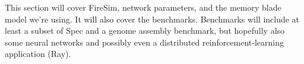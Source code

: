 This section will cover FireSim, network parameters, and the memory blade model we're using. It will also cover the benchmarks. Benchmarks will include at least a subset of Spec and a genome assembly benchmark, but hopefully also some neural networks and possibly even a distributed reinforcement-learning application (Ray).